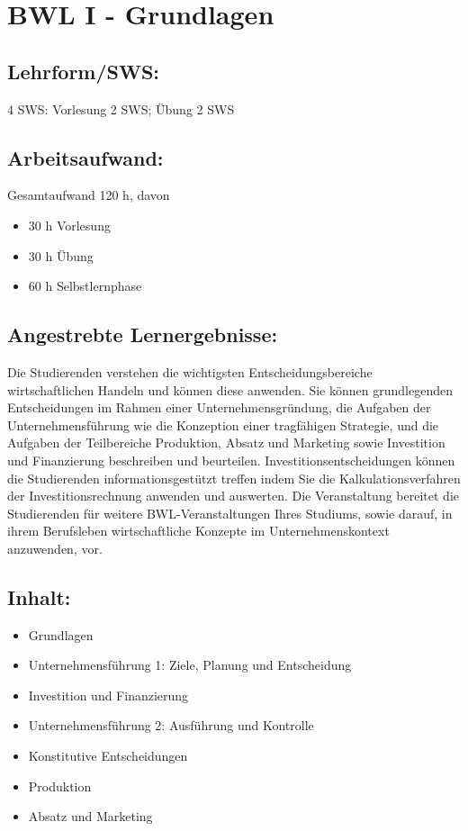 \chapter{BWL I - Grundlagen}\label{bwl-i---grundlagen}

\section*{Lehrform/SWS:}\label{lehrformsws-4}

4 SWS: Vorlesung 2 SWS; Übung 2 SWS

\section*{Arbeitsaufwand:}\label{arbeitsaufwand-4}

Gesamtaufwand 120 h, davon

\begin{itemize}
\item
  30 h Vorlesung
\item
  30 h Übung
\item
  60 h Selbstlernphase
\end{itemize}

\section*{Angestrebte
Lernergebnisse:}\label{angestrebte-lernergebnisse-6}

Die Studierenden verstehen die wichtigsten Entscheidungsbereiche
wirtschaftlichen Handeln und können diese anwenden. Sie können
grundlegenden Entscheidungen im Rahmen einer Unternehmensgründung, die
Aufgaben der Unternehmensführung wie die Konzeption einer tragfähigen
Strategie, und die Aufgaben der Teilbereiche Produktion, Absatz und
Marketing sowie Investition und Finanzierung beschreiben und beurteilen.
Investitionsentscheidungen können die Studierenden informationsgestützt
treffen indem Sie die Kalkulationsverfahren der Investitionsrechnung
anwenden und auswerten. Die Veranstaltung bereitet die Studierenden für
weitere BWL-Veranstaltungen Ihres Studiums, sowie darauf, in ihrem
Berufsleben wirtschaftliche Konzepte im Unternehmenskontext anzuwenden,
vor.

\section*{Inhalt:}\label{inhalt-6}

\begin{itemize}
\item
  Grundlagen
\item
  Unternehmensführung 1: Ziele, Planung und Entscheidung
\item
  Investition und Finanzierung
\item
  Unternehmensführung 2: Ausführung und Kontrolle
\item
  Konstitutive Entscheidungen
\item
  Produktion
\item
  Absatz und Marketing
\end{itemize}

